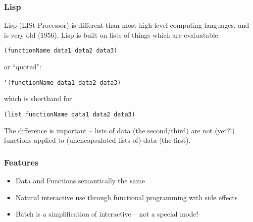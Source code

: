 \documentclass{beamer}
\begin{document}
\begin{frame}[fragile]
  \frametitle{Lisp}

  Lisp (LISt Processor) is different than most high-level computing
  languages, and is very old (1956).  Lisp is built on lists of things
  which are evaluatable.
\begin{verbatim}
(functionName data1 data2 data3)
\end{verbatim}
  or ``quoted'':
\begin{verbatim}
'(functionName data1 data2 data3)
\end{verbatim}
  which is shorthand for 
\begin{verbatim}
(list functionName data1 data2 data3)
\end{verbatim}
  The difference is important -- lists of data (the second/third) are
  not (yet?!) functions applied to (unencapsulated lists of) data (the first).
\end{frame}

\begin{frame}
  \frametitle{Features}
  \begin{itemize}
  \item Data and Functions semantically the same
  \item Natural interactive use through functional programming with
    side effects
  \item Batch is a simplification of interactive -- not a special mode!
  \end{itemize}
\end{frame}




\end{document}
